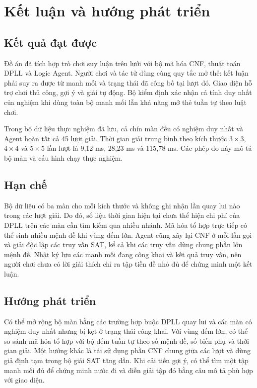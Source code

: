 \clearpage
\section{Kết luận và hướng phát triển}
\subsection{Kết quả đạt được}
Đồ án đã tích hợp trò chơi suy luận trên lưới với bộ mã hóa CNF, thuật
toán DPLL và Logic Agent. Người chơi và tác tử dùng cùng quy tắc mở thẻ:
kết luận phải suy ra được từ manh mối và trạng thái đã công bố tại lượt
đó. Giao diện hỗ trợ chơi thủ công, gợi ý và giải tự động. Bộ kiểm định
xác nhận cả tính duy nhất của nghiệm khi dùng toàn bộ manh mối lẫn khả
năng mở thẻ tuần tự theo luật chơi.

Trong bộ dữ liệu thực nghiệm đã lưu, cả chín màn đều có nghiệm duy nhất
và Agent hoàn tất cả 45 lượt giải. Thời gian giải trung bình theo kích
thước $3\times3$, $4\times4$ và $5\times5$ lần lượt là 9,12 ms, 28,23 ms
và 115,78 ms. Các phép đo này mô tả bộ màn và cấu hình chạy thực nghiệm.

\subsection{Hạn chế}
Bộ dữ liệu có ba màn cho mỗi kích thước và không ghi nhận lần quay lui
nào trong các lượt giải. Do đó, số liệu thời gian hiện tại chưa thể hiện
chi phí của DPLL trên các màn cần tìm kiếm qua nhiều nhánh. Mã hóa tổ
hợp trực tiếp có thể sinh nhiều mệnh đề khi vùng đếm lớn. Agent cũng
xây lại CNF ở mỗi lần gọi và giải độc lập các truy vấn SAT, kể cả khi
các truy vấn dùng chung phần lớn mệnh đề. Nhật ký lưu các manh mối đang
công khai và kết quả truy vấn, nên người chơi chưa có lời giải thích
chỉ ra tập tiền đề nhỏ đủ để chứng minh một kết luận.

\subsection{Hướng phát triển}
Có thể mở rộng bộ màn bằng các trường hợp buộc DPLL quay lui và các
màn có nghiệm duy nhất nhưng bị kẹt ở trạng thái công khai. Với vùng
đếm lớn, có thể so sánh mã hóa tổ hợp với bộ đếm tuần tự theo số mệnh
đề, số biến phụ và thời gian giải. Một hướng khác là tái sử dụng phần
CNF chung giữa các lượt và dùng giả định tạm trong bộ giải SAT tăng
dần. Khi cải tiến gợi ý, có thể tìm một tập manh mối đủ để chứng minh
nước đi và diễn giải tập đó bằng câu mô tả phù hợp với giao diện.
